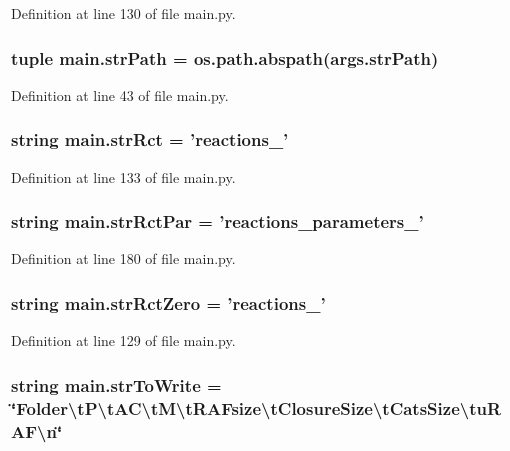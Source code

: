 Definition at line 130 of file main.\-py.

\hypertarget{a00111_ac0b5b603b5f89c10838ce6a42be8c6f7}{
\subsubsection[{str\-Path}]{\setlength{\rightskip}{0pt plus 5cm}tuple main.\-str\-Path = os.\-path.\-abspath(args.\-str\-Path)}}\label{a00111_ac0b5b603b5f89c10838ce6a42be8c6f7}


Definition at line 43 of file main.\-py.

\hypertarget{a00111_a28a37e653a4c0984df32f8d83c3596ff}{
\subsubsection[{str\-Rct}]{\setlength{\rightskip}{0pt plus 5cm}string main.\-str\-Rct = 'reactions\-\_\-'}}\label{a00111_a28a37e653a4c0984df32f8d83c3596ff}


Definition at line 133 of file main.\-py.

\hypertarget{a00111_af48af84bff2351a55727aba6a63c1b52}{
\subsubsection[{str\-Rct\-Par}]{\setlength{\rightskip}{0pt plus 5cm}string main.\-str\-Rct\-Par = 'reactions\-\_\-parameters\-\_\-'}}\label{a00111_af48af84bff2351a55727aba6a63c1b52}


Definition at line 180 of file main.\-py.

\hypertarget{a00111_adbfa32333003aa707723362b43bc11ff}{
\subsubsection[{str\-Rct\-Zero}]{\setlength{\rightskip}{0pt plus 5cm}string main.\-str\-Rct\-Zero = 'reactions\-\_\-'}}\label{a00111_adbfa32333003aa707723362b43bc11ff}


Definition at line 129 of file main.\-py.

\hypertarget{a00111_ab9980383a541b03ce91d6b812a4bf79a}{
\subsubsection[{str\-To\-Write}]{\setlength{\rightskip}{0pt plus 5cm}string main.\-str\-To\-Write = \char`\"{}Folder\textbackslash{}t\-P\textbackslash{}t\-A\-C\textbackslash{}t\-M\textbackslash{}t\-R\-A\-Fsize\textbackslash{}t\-Closure\-Size\textbackslash{}t\-Cats\-Size\textbackslash{}tu\-R\-A\-F\textbackslash{}n\char`\"{}}}\label{a00111_ab9980383a541b03ce91d6b812a4bf79a}


